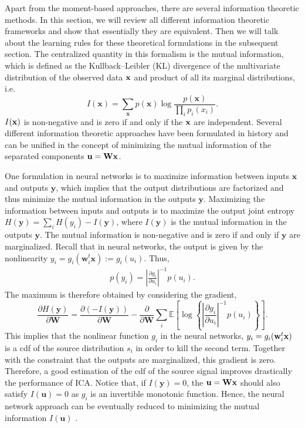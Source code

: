 \documentclass[aps,prl,preprint,superscriptaddress]{revtex4-2}
\begin{document}
Apart from the moment-based approaches, there are several information theoretic methods. In this section, we will review all different information theoretic frameworks and show that essentially they are equivalent. Then we will talk about the learning rules for these theoretical formulations in the subsequent section.
The centralized quantity in this formalism is the mutual information, which is defined as the Kullback--Leibler (KL) divergence of the multivariate distribution of the observed data $\bf{x}$ and product of all its marginal distributions, i.e.
\begin{equation}
I(\mathbf{x}) = \sum_{\mathbf{x}}p(\mathbf{x})\log\frac{p(\mathbf{x})}{\prod_{i}p_{i}(x_{i})}.
\end{equation} $I(\bf{x})$ is non-negative and is zero if and only if the $\bf{x}$ are independent. Several different information theoretic approaches have been formulated in history and can be unified in the concept of minimizing the mutual information of the separated components $\bf{u} = \bf{W}\bf{x}$.

One formulation in neural networks is to maximize information between inputs $\mathbf{x}$ and outputs $\mathbf{y}$, which implies that the output distributions are factorized and thus minimize the mutual information in the outputs $\mathbf{y}$.
Maximizing the information between inputs and outputs is to maximize the output joint entropy $H(\mathbf{y}) = \sum_{i}H(y_{i}) - I(\mathbf{y})$, where $I(\mathbf{y})$ is the mutual information in the outputs $\mathbf{y}$.
The mutual information is non-negative and is zero if and only if $\mathbf{y}$ are marginalized.
Recall that in neural networks, the output is given by the nonlinearity $y_{i} = g_{i}(\mathbf{w}_{i}^{t}\mathbf{x}) := g_{i}(u_{i})$. Thus,
\begin{align}
p(y_{i}) = \left|\frac{\partial g_{i}}{\partial u_{i}} \right|^{-1} p(u_{i}).
\end{align}
The maximum is therefore obtained by considering the gradient,
\begin{equation}
\frac{\partial H(\mathbf{y})}{\partial \mathbf{W}} = \frac{\partial (-I(\mathbf{y}))}{\partial \mathbf{W}}
-\frac{\partial}{\partial \mathbf{W}}\sum_{i} \mathbb{E} \left[\log  \left\{\left|\frac{\partial g_{i}}{\partial u_{i}}\right|^{-1} p(u_{i}) \right\} \right].
\end{equation}
This implies that the nonlinear function $g_{i}$ in the neural networks, $y_{i} = g_{i}(\mathbf{w}_{i}^{t}\bf{x})$ is a cdf of the source distribution $s_{i}$ in order to kill the second term. Together with the constraint that the outputs are marginalized, this gradient is zero. Therefore, a good estimation of the cdf of the source signal improves drastically the performance of ICA. Notice that, if $I(\mathbf{y}) = 0$, the $\mathbf{u} = \bf{W}\bf{x}$ should also satisfy $I(\mathbf{u}) = 0$ as $g_{i}$ is an invertible monotonic function. Hence, the neural network approach can be eventually reduced to minimizing the mutual information $I(\mathbf{u})$ \cite{lee1998independent}.
\end{document}
